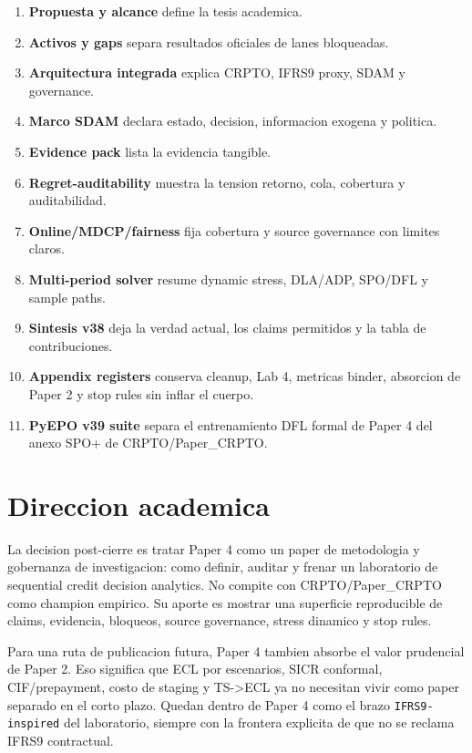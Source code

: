 \documentclass[
  spanish,
  11pt,
  letterpaper,
]{scrbook}
\providecommand{\tightlist}{%
  \setlength{\itemsep}{0pt}\setlength{\parskip}{0pt}}
\theoremstyle{plain}
\theoremstyle{remark}
\begin{document}
\begin{enumerate}
\def\labelenumi{\arabic{enumi}.}
\tightlist
\item
  \textbf{Propuesta y alcance} define la tesis academica.
\item
  \textbf{Activos y gaps} separa resultados oficiales de lanes
  bloqueadas.
\item
  \textbf{Arquitectura integrada} explica CRPTO, IFRS9 proxy, SDAM y
  governance.
\item
  \textbf{Marco SDAM} declara estado, decision, informacion exogena y
  politica.
\item
  \textbf{Evidence pack} lista la evidencia tangible.
\item
  \textbf{Regret-auditability} muestra la tension retorno, cola,
  cobertura y auditabilidad.
\item
  \textbf{Online/MDCP/fairness} fija cobertura y source governance con
  limites claros.
\item
  \textbf{Multi-period solver} resume dynamic stress, DLA/ADP, SPO/DFL y
  sample paths.
\item
  \textbf{Sintesis v38} deja la verdad actual, los claims permitidos y
  la tabla de contribuciones.
\item
  \textbf{Appendix registers} conserva cleanup, Lab 4, metricas binder,
  absorcion de Paper 2 y stop rules sin inflar el cuerpo.
\item
  \textbf{PyEPO v39 suite} separa el entrenamiento DFL formal de Paper 4
  del anexo SPO+ de CRPTO/Paper\_CRPTO.
\end{enumerate}

\section{Direccion academica}\label{direccion-academica}

La decision post-cierre es tratar Paper 4 como un paper de metodologia y
gobernanza de investigacion: como definir, auditar y frenar un
laboratorio de sequential credit decision analytics. No compite con
CRPTO/Paper\_CRPTO como champion empirico. Su aporte es mostrar una
superficie reproducible de claims, evidencia, bloqueos, source
governance, stress dinamico y stop rules.

Para una ruta de publicacion futura, Paper 4 tambien absorbe el valor
prudencial de Paper 2. Eso significa que ECL por escenarios, SICR
conformal, CIF/prepayment, costo de staging y TS-\textgreater ECL ya no
necesitan vivir como paper separado en el corto plazo. Quedan dentro de
Paper 4 como el brazo \texttt{IFRS9-inspired} del laboratorio, siempre
con la frontera explicita de que no se reclama IFRS9 contractual.
\end{document}
